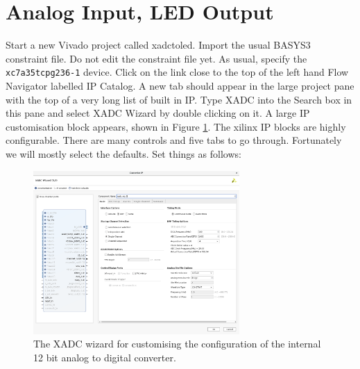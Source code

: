 \documentclass[../physical_computing.tex]{subfiles}
\begin{document}
\section{Analog Input, LED Output}
\label{sec:xadcinput}

Start a new Vivado project called xadctoled. Import the usual BASYS3 constraint file. Do not edit the constraint file yet. As usual, specify the \texttt{xc7a35tcpg236-1} device. Click on the link close to the top of the left hand Flow Navigator labelled IP Catalog. A new tab should appear in the large project pane with the top of a very long list of built in IP. Type XADC into the Search box in this pane and select XADC Wizard by double clicking on it. A large IP customisation block appears, shown in Figure \ref{fig:xadcwizard}. The xilinx IP blocks are highly configurable. There are many controls and five tabs to go through. Fortunately we will mostly select the defaults. Set things as follows:

\begin{figure}[htbp]
    \centering
    \includegraphics[width=0.7\textwidth]{appendix_6/figures/xadc_wizard.png}
    \caption{The XADC wizard for customising the configuration of the internal 12 bit analog to digital converter.}
    \label{fig:xadcwizard}
\end{figure}
\end{document}
